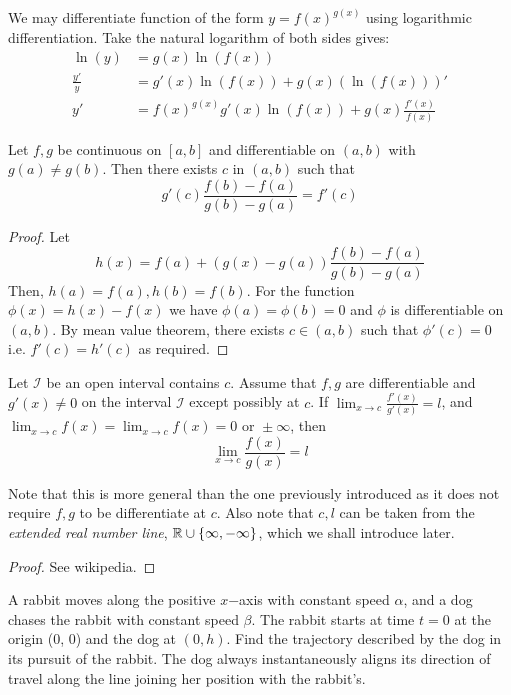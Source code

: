 \documentclass[11pt]{article}
\begin{document}
\begin{example}
  We may differentiate function of the form \(y=f(x)^{g(x)}\) using logarithmic differentiation. Take the natural logarithm of both sides gives:
  \begin{align*}
    \ln(y) &= g(x)\ln(f(x)) \\
    \frac{y'}{y} &= g'(x)\ln(f(x))+g(x)(\ln(f(x)))' \\
    y' &= f(x)^{g(x)}g'(x)\ln(f(x))+g(x)\frac{f'(x)}{f(x)}
  \end{align*}
\end{example}

\begin{theorem}
  Let \(f,g\) be continuous on \([a,b]\) and differentiable on \((a,b)\) with \(g(a)\neq g(b)\). Then there exists \(c\) in \((a,b)\) such that
  \[g'(c)\frac{f(b)-f(a)}{g(b)-g(a)}=f'(c)\]
\end{theorem}
\begin{proof}
  Let \[h(x)=f(a)+(g(x)-g(a))\frac{f(b)-f(a)}{g(b)-g(a)}\]
  Then, \(h(a)=f(a), h(b)=f(b)\). For the function \(\phi(x)=h(x)-f(x)\) we have \(\phi(a)=\phi(b)=0\) and \(\phi\) is differentiable on \((a,b)\). By mean value theorem, there exists \(c\in (a,b)\) such that \(\phi '(c) =0\) i.e. \(f'(c)=h'(c)\) as required.
\end{proof}

\begin{theorem}
  Let \(\mathcal{I}\) be an open interval contains \(c\). Assume that \(f,g\) are differentiable and \(g'(x)\neq 0\) on the interval \(\mathcal{I}\) except possibly at \(c\). If \(\lim_{x\to c}\frac{f'(x)}{g'(x)}=l\), and \(\lim_{x\to c}f(x) = \lim_{x\to c}f(x) = 0 \text{ or } \pm\infty\), then
  \[\lim_{x\to c}\frac{f(x)}{g(x)} = l\]
\end{theorem}
Note that this is more general than the one previously introduced as it does not require \(f,g\) to be differentiate at \(c\). Also note that \(c,l\) can be taken from the \emph{extended real number line}, \(\mathbb{R}\cup\{\infty,-\infty\}\), which we shall introduce later.
\begin{proof}
  See wikipedia.
\end{proof}

\begin{problem}
  A rabbit moves along the positive \(x\)−axis with constant speed \(\alpha\), and a dog chases the rabbit with constant speed \(\beta\). The rabbit starts at time \(t=0\) at the origin (0, 0) and the dog at \((0,h)\). Find the trajectory described by the dog in its pursuit of the rabbit. The dog always instantaneously aligns its direction of travel along the line joining her position
with the rabbit’s.
\end{problem}
\begin{solution}
\end{solution}
\end{document}
